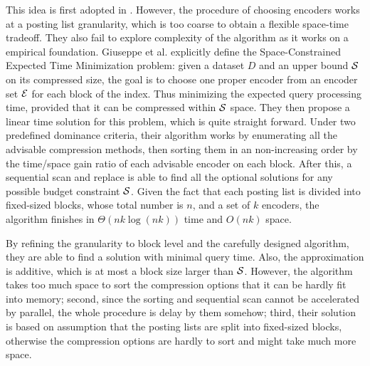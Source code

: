 \documentclass{sig-alternate-05-2015}
\begin{document}
This idea is first adopted in \cite{yan2009inverted}.
However, the procedure of choosing encoders works at a posting list granularity, which is too coarse to obtain a flexible space-time tradeoff.
They also fail to explore complexity of the algorithm as it works on a empirical foundation.
Giuseppe et al. \cite{ottaviano2015optimal} explicitly define the Space-Constrained Expected Time Minimization problem: given a dataset $ D $ and an upper bound $ \cal S $ on its compressed size, the goal is to choose one proper encoder from an encoder set $ \cal E $ for each block of the index.
Thus minimizing the expected query processing time, provided that it can be compressed within $ \cal S $ space.
They then propose a linear time solution for this problem, which is quite straight forward.
Under two predefined dominance criteria, their algorithm works by enumerating all the advisable compression methods, then sorting them in an non-increasing order by the time/space gain ratio of each advisable encoder on each block.
After this, a sequential scan and replace is able to find all the optional solutions for any possible budget constraint $ \cal S $.
Given the fact that each posting list is divided into fixed-sized blocks, whose total number is $ n $, and a set of $ k $ encoders, the algorithm finishes in $ \Theta(nk\log(nk)) $ time and $ O(nk) $ space.

By refining the granularity to block level and the carefully designed algorithm, they are able to find a solution with minimal query time.
Also, the approximation is additive, which is at most a block size larger than $ \cal S $.
However, the algorithm takes too much space to sort the compression options that it can be hardly fit into memory; second, since the sorting and sequential scan cannot be accelerated by parallel, the whole procedure is delay by them somehow; third, their solution is based on assumption that the posting lists are split into fixed-sized blocks, otherwise the compression options are hardly to sort and might take much more space. 
\end{document}
